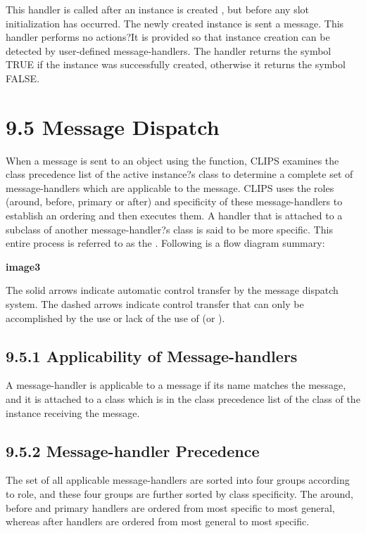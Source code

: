 \documentclass[letterpaper,10pt,english]{sphinxmanual}
\begin{document}
This handler is called after an instance is created , but before any
slot initialization has occurred. The newly created instance is sent a
 message. This handler performs no actions?It is provided so
that instance creation can be detected by user-defined message-handlers.
The handler returns the symbol TRUE if the instance was successfully
created, otherwise it returns the symbol FALSE.


\section{9.5 Message Dispatch}
\label{\detokenize{cool:message-dispatch}}
When a message is sent to an object using the  function, CLIPS
examines the class precedence list of the active instance?s class to
determine a complete set of message-handlers which are applicable to the
message. CLIPS uses the roles (around, before, primary or after) and
specificity of these message-handlers to establish an ordering and then
executes them. A handler that is attached to a subclass of another
message-handler?s class is said to be more specific. This entire process
is referred to as the . Following is a flow diagram
summary:

{\color{red}\bfseries{}\textbar{}image3\textbar{}}

The solid arrows indicate automatic control transfer by the message
dispatch system. The dashed arrows indicate control transfer that can
only be accomplished by the use or lack of the use of
 (or ).


\subsection{9.5.1 Applicability of Message-handlers}
\label{\detokenize{cool:applicability-of-message-handlers}}
A message-handler is applicable to a message if its name matches the
message, and it is attached to a class which is in the class precedence
list of the class of the instance receiving the message.


\subsection{9.5.2 Message-handler Precedence}
\label{\detokenize{cool:message-handler-precedence}}
The set of all applicable message-handlers are sorted into four groups
according to role, and these four groups are further sorted by class
specificity. The around, before and primary handlers are ordered from
most specific to most general, whereas after handlers are ordered from
most general to most specific.
\end{document}
